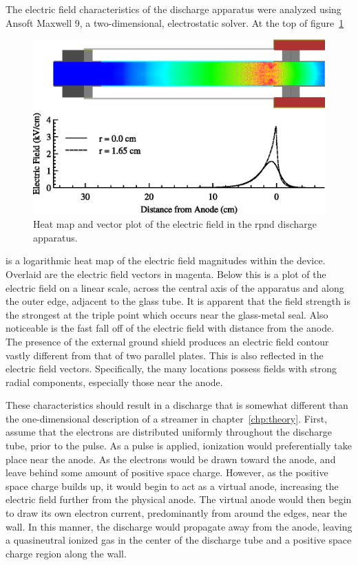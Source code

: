 The electric field characteristics of the discharge apparatus were analyzed
using Ansoft Maxwell 9, a two-dimensional, electrostatic solver. At the top of
figure~\ref{fig:cfields}
\begin{figure}
  \centering
  \includegraphics{./chapters/experiment/figures/cfields.eps}
  \caption{Heat map and vector plot of the electric field in the \acs{rpnd}
  discharge apparatus.}
  \label{fig:cfields}
\end{figure}
is a logarithmic heat map of the electric field magnitudes within the device.
Overlaid are the electric field vectors in magenta. Below this is a plot of the
electric field on a linear scale, across the central axis of the apparatus and
along the outer edge, adjacent to the glass tube. It is apparent that the field
strength is the strongest at the triple point which occurs near the glass-metal
seal. Also noticeable is the fast fall off of the electric field with distance
from the anode. The presence of the external ground shield produces an electric
field contour vastly different from that of two parallel plates. This is also
reflected in the electric field vectors. Specifically, the many locations
possess fields with strong radial components, especially those near the anode.

These characteristics should result in a discharge that is somewhat different
than the one-dimensional description of a streamer in chapter~\ref{chp:theory}.
First, assume that the electrons are distributed uniformly throughout the
discharge tube, prior to the pulse. As a pulse is applied, ionization would
preferentially take place near the anode. As the electrons would be drawn toward
the anode, and leave behind some amount of positive space charge. However, as
the positive space charge builds up, it would begin to act as a virtual anode,
increasing the electric field further from the physical anode. The virtual anode
would then begin to draw its own electron current, predominantly from around the
edges, near the wall. In this manner, the discharge would propagate away from
the anode, leaving a quasineutral ionized gas in the center of the discharge
tube and a positive space charge region along the wall.

